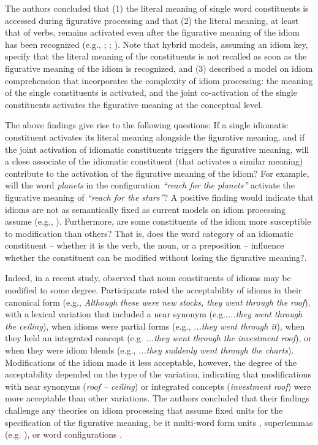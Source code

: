\documentclass[output=paper]{langsci/langscibook}
\begin{document}
The authors concluded that (1) the literal meaning of single word constituents is accessed during figurative processing and that (2) the literal meaning, at least that of verbs, remains activated even after the figurative meaning of the idiom has been recognized (e.g., \citealt{cacciari:1988}; \citealt{cutting:1997}; \citealt{sprenger:2006}). Note that hybrid models, assuming an idiom key, specify that the literal meaning of the constituents is not recalled as soon as the figurative meaning of the idiom is recognized, and (3) described a model on idiom comprehension that incorporates the complexity of idiom processing: the meaning of the single constituents is activated, and the joint co-activation of the single constituents activates the figurative meaning at the conceptual level.

The above findings give rise to the following questions: If a single idiomatic constituent activates its literal meaning alongside the figurative meaning, and if the joint activation of idiomatic constituents triggers the figurative meaning, will a close associate of the idiomatic constituent (that activates a similar meaning) contribute to the activation of the figurative meaning of the idiom? For example, will the word \textit{planets} in the configuration \textit{``reach for the planets''} activate the figurative meaning of \textit{``reach for the stars''}? A positive finding would indicate that idioms are not as semantically fixed as current models on idiom processing assume (e.g., \citealt{sprenger:2006}). Furthermore, are some constituents of the idiom more susceptible to modification than others? That is, does the word category of an idiomatic constituent -- whether it is the verb, the noun, or a preposition -- influence whether the constituent can be modified without losing the figurative meaning?.

Indeed, in a recent study, \citealt{geeraert:2017} observed that noun constituents of idioms may be modified to some degree.  Participants rated the acceptability of idioms in their canonical form (e.g., \textit{Although these were new stocks, they went through the roof}), with a lexical variation that included a near synonym (e.g.,\textit{...they went through the ceiling}), when idioms were partial forms (e.g., \textit{...they went through it}), when they held an integrated concept (e.g. \textit{...they went through the investment roof}), or when they were idiom blends (e.g., \textit{...they suddenly went through the charts}). Modifications of the idiom made it less acceptable, however, the degree of the acceptability depended on the type of the variation, indicating that modifications with near synonyms (\textit{roof – ceiling}) or integrated concepts (\textit{investment roof}) were more acceptable than other variations. The authors concluded that their findings challenge any theories on idiom processing that assume fixed units for the specification of the figurative meaning, be it multi-word form units \citep{bobrow:1973}, superlemmas (e.g. \citealt{sprenger:2006}), or word configurations \citep{cacciari:1988}. 
\end{document}
